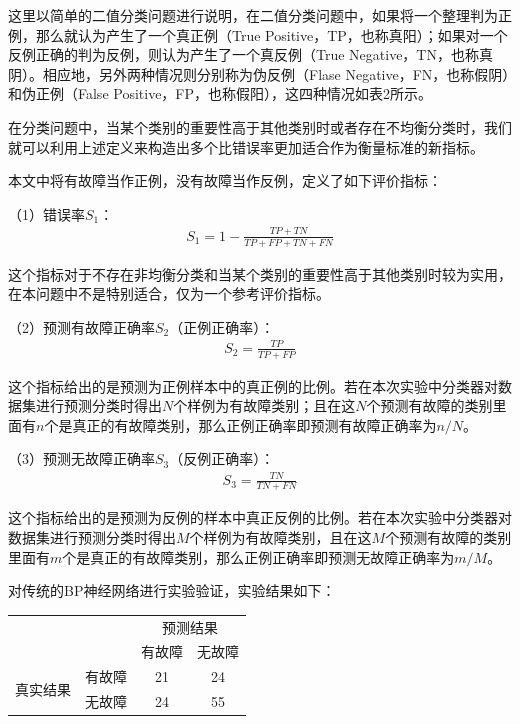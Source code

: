 \documentclass{ctacn}%
\begin{document}
\begin{multicols}{2}
这里以简单的二值分类问题进行说明，在二值分类问题中，如果将一个整理判为正例，那么就认为产生了一个真正例（True Positive，TP，也称真阳）；如果对一个反例正确的判为反例，则认为产生了一个真反例（True Negative，TN，也称真阴）。相应地，另外两种情况则分别称为伪反例（Flase Negative，FN，也称假阴）和伪正例（False Positive，FP，也称假阳），这四种情况如表2所示。

在分类问题中，当某个类别的重要性高于其他类别时或者存在不均衡分类时，我们就可以利用上述定义来构造出多个比错误率更加适合作为衡量标准的新指标。

本文中将有故障当作正例，没有故障当作反例，定义了如下评价指标：

（1）错误率$S_1$：
\begin{align}
S_1=1-\frac{TP+TN}{TP+FP+TN+FN}
\end{align}

这个指标对于不存在非均衡分类和当某个类别的重要性高于其他类别时较为实用，在本问题中不是特别适合，仅为一个参考评价指标。

（2）预测有故障正确率$S_2$（正例正确率）：
\begin{align}
S_2=\frac{TP}{TP+FP}
\end{align}

这个指标给出的是预测为正例样本中的真正例的比例。若在本次实验中分类器对数据集进行预测分类时得出$N$个样例为有故障类别；且在这$N$个预测有故障的类别里面有$n$个是真正的有故障类别，那么正例正确率即预测有故障正确率为$n/N$。

（3）预测无故障正确率$S_3$（反例正确率）：
\begin{align}
S_3=\frac{TN}{TN+FN}
\end{align}

这个指标给出的是预测为反例的样本中真正反例的比例。若在本次实验中分类器对数据集进行预测分类时得出$M$个样例为有故障类别，且在这$M$个预测有故障的类别里面有$m$个是真正的有故障类别，那么正例正确率即预测无故障正确率为$m/M$。

对传统的BP神经网络进行实验验证，实验结果如下：


\begin{center}
	\label{tab:3}
	\begin{tabular} {cccc}\toprule
		\multirow{2}{*}[-2pt]{}&\multirow{2}{*}[-2pt]{}&\multicolumn{2}{c}{预测结果}\\
		\cmidrule(lr){3-4}
		&&有故障&无故障\\\hline
		\multirow{2}{*}[-2pt]{真实结果}&有故障&21&24\\
		&无故障&24&55\\
		\bottomrule
\end{tabular}\end{center}


\end{multicols}
\end{document}
